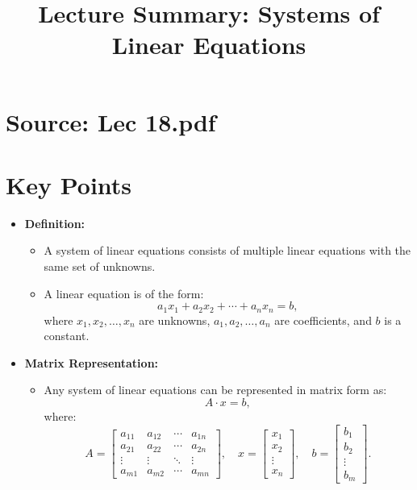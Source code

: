 \documentclass{article}
\title{Lecture Summary: Systems of Linear Equations}
\author{}
\date{}
\begin{document}
\maketitle

\section*{Source: Lec 18.pdf}

\section*{Key Points}

\begin{itemize}
  \item \textbf{Definition:}
    \begin{itemize}
      \item A system of linear equations consists of multiple linear equations with the same set of unknowns.
      \item A linear equation is of the form:
        \[
          a_1x_1 + a_2x_2 + \cdots + a_nx_n = b,
        \]
        where $x_1, x_2, \ldots, x_n$ are unknowns, $a_1, a_2, \ldots, a_n$ are coefficients, and $b$ is a constant.
    \end{itemize}

  \item \textbf{Matrix Representation:}
    \begin{itemize}
      \item Any system of linear equations can be represented in matrix form as:
        \[
          A \cdot x = b,
        \]
        where:
        \[
          A =
          \begin{bmatrix}
            a_{11} & a_{12} & \cdots & a_{1n} \\
            a_{21} & a_{22} & \cdots & a_{2n} \\
            \vdots & \vdots & \ddots & \vdots \\
            a_{m1} & a_{m2} & \cdots & a_{mn}
          \end{bmatrix},
          \quad
          x =
          \begin{bmatrix}
            x_1 \\
            x_2 \\
            \vdots \\
            x_n
          \end{bmatrix},
          \quad
          b =
          \begin{bmatrix}
            b_1 \\
            b_2 \\
            \vdots \\
            b_m
          \end{bmatrix}.
        \]
    \end{itemize}


\end{itemize}
\end{document}
